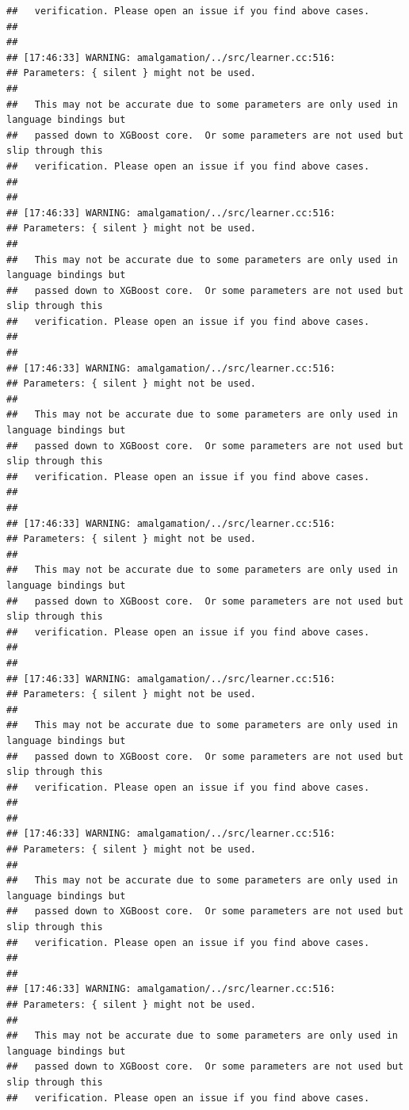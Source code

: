 \documentclass[AMS,STIX2COL]{WileyNJD-v2}\usepackage[]{graphicx}\usepackage[]{color}
\makeatletter
\newenvironment{kframe}{%
 \def\at@end@of@kframe{}%
 \ifinner\ifhmode%
  \def\at@end@of@kframe{\end{minipage}}%
  \begin{minipage}{\columnwidth}%
 \fi\fi%
 \def\FrameCommand##1{\hskip\@totalleftmargin \hskip-\fboxsep
 \colorbox{shadecolor}{##1}\hskip-\fboxsep
     \hskip-\linewidth \hskip-\@totalleftmargin \hskip\columnwidth}%
 \MakeFramed {\advance\hsize-\width
   \@totalleftmargin\z@ \linewidth\hsize
   \@setminipage}}%
 {\par\unskip\endMakeFramed%
 \at@end@of@kframe}
\newenvironment{knitrout}{}{} %
\makeatother
\begin{document}
\begin{knitrout}
\begin{kframe}
\begin{verbatim}
##   verification. Please open an issue if you find above cases.
## 
## 
## [17:46:33] WARNING: amalgamation/../src/learner.cc:516: 
## Parameters: { silent } might not be used.
## 
##   This may not be accurate due to some parameters are only used in language bindings but
##   passed down to XGBoost core.  Or some parameters are not used but slip through this
##   verification. Please open an issue if you find above cases.
## 
## 
## [17:46:33] WARNING: amalgamation/../src/learner.cc:516: 
## Parameters: { silent } might not be used.
## 
##   This may not be accurate due to some parameters are only used in language bindings but
##   passed down to XGBoost core.  Or some parameters are not used but slip through this
##   verification. Please open an issue if you find above cases.
## 
## 
## [17:46:33] WARNING: amalgamation/../src/learner.cc:516: 
## Parameters: { silent } might not be used.
## 
##   This may not be accurate due to some parameters are only used in language bindings but
##   passed down to XGBoost core.  Or some parameters are not used but slip through this
##   verification. Please open an issue if you find above cases.
## 
## 
## [17:46:33] WARNING: amalgamation/../src/learner.cc:516: 
## Parameters: { silent } might not be used.
## 
##   This may not be accurate due to some parameters are only used in language bindings but
##   passed down to XGBoost core.  Or some parameters are not used but slip through this
##   verification. Please open an issue if you find above cases.
## 
## 
## [17:46:33] WARNING: amalgamation/../src/learner.cc:516: 
## Parameters: { silent } might not be used.
## 
##   This may not be accurate due to some parameters are only used in language bindings but
##   passed down to XGBoost core.  Or some parameters are not used but slip through this
##   verification. Please open an issue if you find above cases.
## 
## 
## [17:46:33] WARNING: amalgamation/../src/learner.cc:516: 
## Parameters: { silent } might not be used.
## 
##   This may not be accurate due to some parameters are only used in language bindings but
##   passed down to XGBoost core.  Or some parameters are not used but slip through this
##   verification. Please open an issue if you find above cases.
## 
## 
## [17:46:33] WARNING: amalgamation/../src/learner.cc:516: 
## Parameters: { silent } might not be used.
## 
##   This may not be accurate due to some parameters are only used in language bindings but
##   passed down to XGBoost core.  Or some parameters are not used but slip through this
##   verification. Please open an issue if you find above cases.

\end{verbatim}
\end{kframe}
\end{knitrout}
\end{document}
